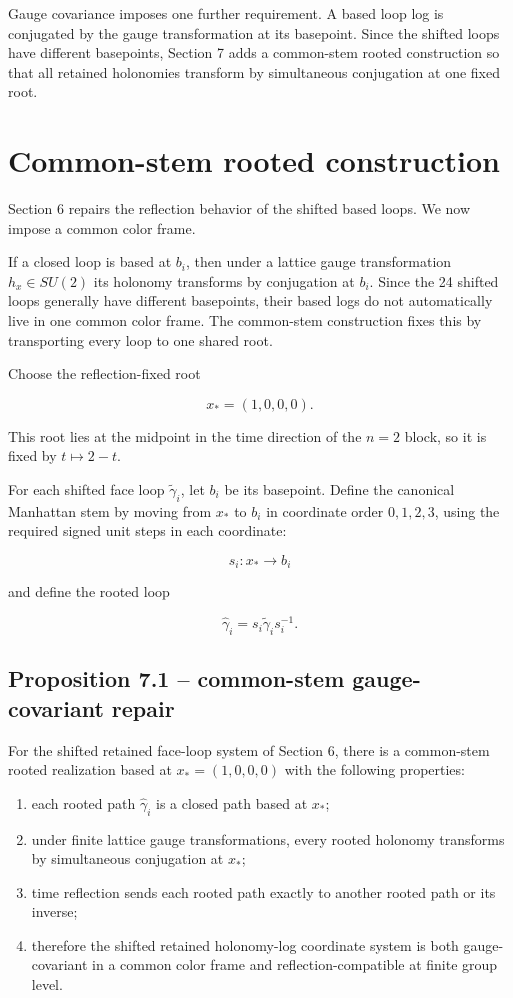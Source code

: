 \documentclass[10pt]{article}
\begin{document}
Gauge covariance imposes one further requirement.  A based loop log is conjugated by the gauge transformation at its basepoint.  Since the shifted loops have different basepoints, Section 7 adds a common-stem rooted construction so that all retained holonomies transform by simultaneous conjugation at one fixed root.

\section{Common-stem rooted construction}

Section 6 repairs the reflection behavior of the shifted based loops.  We now impose a common color frame.

If a closed loop is based at \(b_i\), then under a lattice gauge transformation \(h_x\in SU(2)\) its holonomy transforms by conjugation at \(b_i\).  Since the 24 shifted loops generally have different basepoints, their based logs do not automatically live in one common color frame.  The common-stem construction fixes this by transporting every loop to one shared root.

Choose the reflection-fixed root

\[
x_\ast=(1,0,0,0).
\]

This root lies at the midpoint in the time direction of the \(n=2\) block, so it is fixed by \(t\mapsto2-t\).

For each shifted face loop \(\widetilde\gamma_i\), let \(b_i\) be its basepoint.  Define the canonical Manhattan stem by moving from \(x_\ast\) to \(b_i\) in coordinate order \(0,1,2,3\), using the required signed unit steps in each coordinate:

\[
s_i:x_\ast\to b_i
\]

and define the rooted loop

\[
\widehat{\gamma}_i=s_i\widetilde\gamma_i s_i^{-1}.
\]

\subsection{Proposition 7.1 -- common-stem gauge-covariant repair}

For the shifted retained face-loop system of Section 6, there is a common-stem rooted realization based at \(x_\ast=(1,0,0,0)\) with the following properties:

\begin{enumerate}[leftmargin=*]
\item each rooted path \(\widehat\gamma_i\) is a closed path based at \(x_\ast\);
\item under finite lattice gauge transformations, every rooted holonomy transforms by simultaneous conjugation at \(x_\ast\);
\item time reflection sends each rooted path exactly to another rooted path or its inverse;
\item therefore the shifted retained holonomy-log coordinate system is both gauge-covariant in a common color frame and reflection-compatible at finite group level.
\end{enumerate}
\end{document}
